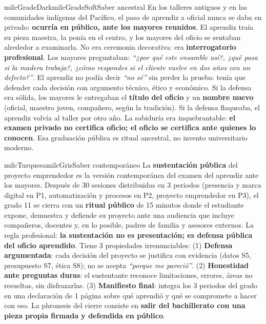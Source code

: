 \documentclass[11pt,letterpaper]{article}
\begin{document}
\begin{softbox}{milcGradeDark}{milcGradeSoft}{Saber ancestral}
En los talleres antiguos y en las comunidades indígenas del Pacífico, el paso de aprendiz a oficial nunca se daba en privado: \textbf{ocurría en público, ante los mayores reunidos}. El aprendiz traía su pieza maestra, la ponía en el centro, y los mayores del oficio se sentaban alrededor a examinarla. No era ceremonia decorativa: era \textbf{interrogatorio profesional}. Los mayores preguntaban: \emph{``¿por qué este ensamble así?, ¿qué pasa si la madera trabaja?, ¿cómo respondes si el cliente vuelve en dos años con un defecto?''}. El aprendiz no podía decir \emph{``no sé''} sin perder la prueba: tenía que defender cada decisión con argumento técnico, ético y económico. Si la defensa era sólida, los mayores le entregaban el \textbf{título del oficio} y un \textbf{nombre nuevo} (oficial, maestro joven, compañero, según la tradición). Si la defensa flaqueaba, el aprendiz volvía al taller por otro año. La sabiduría era inquebrantable: \textbf{el examen privado no certifica oficio; el oficio se certifica ante quienes lo conocen}. Esa graduación pública es ritual ancestral, no invento universitario moderno.
\end{softbox}

\begin{softbox}{milcTurquesa}{milcGris}{Saber contemporáneo}
La \textbf{sustentación pública} del proyecto emprendedor es la versión contemporánea del examen del aprendiz ante los mayores. Después de 30 sesiones distribuidas en 3 periodos (presencia y marca digital en P1, automatización y procesos en P2, proyecto emprendedor en P3), el grado 11 se cierra con un \textbf{ritual público} de 15 minutos donde el estudiante expone, demuestra y defiende su proyecto ante una audiencia que incluye compañeros, docentes y, en lo posible, padres de familia y asesores externos. La regla profesional: \textbf{la sustentación no es presentación; es defensa pública del oficio aprendido}. Tiene 3 propiedades irrenunciables: (1) \textbf{Defensa argumentada}: cada decisión del proyecto se justifica con evidencia (datos S5, presupuesto S7, ética S8); no se acepta \emph{``porque me pareció''}. (2) \textbf{Honestidad ante preguntas duras}: el sustentante reconoce limitaciones, errores, áreas no resueltas, sin disfrazarlas. (3) \textbf{Manifiesto final}: integra los 3 periodos del grado en una declaración de 1 página sobre qué aprendió y qué se compromete a hacer con eso. La phronesis del cierre consiste en \textbf{salir del bachillerato con una pieza propia firmada y defendida en público}.
\end{softbox}
\end{document}
